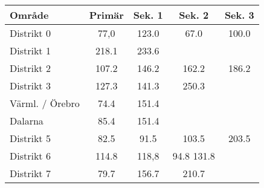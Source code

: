 \documentclass[10pt,swedish,a4paper]{article}
\begin{document}
\begin{longtable}{lcccc}
	\textbf{Område} & \textbf{Primär} & \textbf{Sek. 1} & \textbf{Sek. 2} & \textbf{Sek. 3} \\ \hline
	Distrikt 0      &      77,0       &      123.0      &      67.0       &      100.0      \\
	Distrikt 1      &      218.1      &      233.6      &                 &  \\
	Distrikt 2      &      107.2      &      146.2      &      162.2      &      186.2      \\
	Distrikt 3      &      127.3      &      141.3      &      250.3      &  \\
	Värml. / Örebro &      74.4       &      151.4      &                 &  \\
	Dalarna         &      85.4       &      151.4      &                 &  \\
	Distrikt 5      &      82.5       &      91.5       &      103.5      &      203.5      \\
	Distrikt 6      &      114.8      &      118,8      &   94.8 131.8    &  \\
	Distrikt 7      &      79.7       &      156.7      &      210.7      &
\end{longtable}
\end{document}
